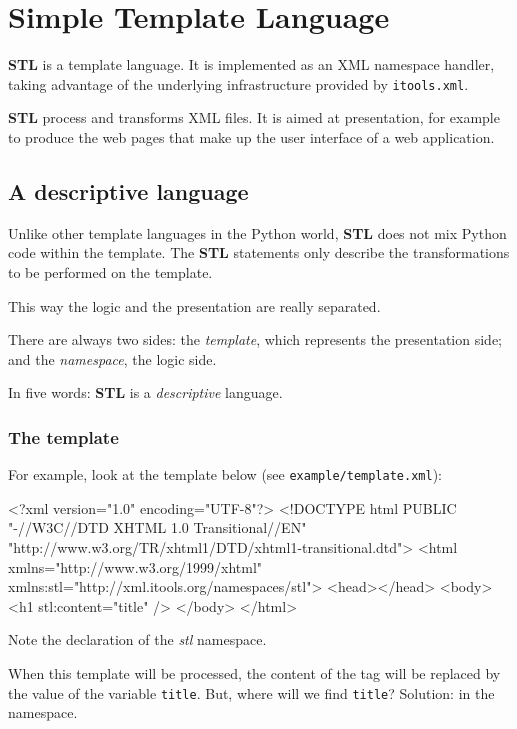 \chapter{Simple Template Language}

{\bf STL} is a template language. It is implemented as an XML namespace
handler, taking advantage of the underlying infrastructure provided by
{\tt itools.xml}.

{\bf STL} process and transforms XML files. It is aimed at presentation,
for example to produce the web pages that make up the user interface of
a web application.


\section{A descriptive language}

Unlike other template languages in the Python world, {\bf STL} does not
mix Python code within the template. The {\bf STL} statements only describe
the transformations to be performed on the template.

This way the logic and the presentation are really separated.

There are always two sides: the {\em template}, which represents the
presentation side; and the {\em namespace}, the logic side.

In five words: {\bf STL} is a {\em descriptive} language.

\subsection{The template}

For example, look at the template below (see {\tt example/template.xml}):

\begin{code}
    <?xml version="1.0" encoding="UTF-8"?>
    <!DOCTYPE html
         PUBLIC "-//W3C//DTD XHTML 1.0 Transitional//EN"
         "http://www.w3.org/TR/xhtml1/DTD/xhtml1-transitional.dtd">
    <html xmlns="http://www.w3.org/1999/xhtml"
          xmlns:stl="http://xml.itools.org/namespaces/stl">
      <head></head>
      <body>
        <h1 stl:content="title" />
      </body>
    </html>
\end{code}

Note the declaration of the {\em stl} namespace.

When this template will be processed, the content of the {\tt <h1>} tag
will be replaced by the value of the variable {\tt title}. But, where will
we find {\tt title}? Solution: in the namespace.

